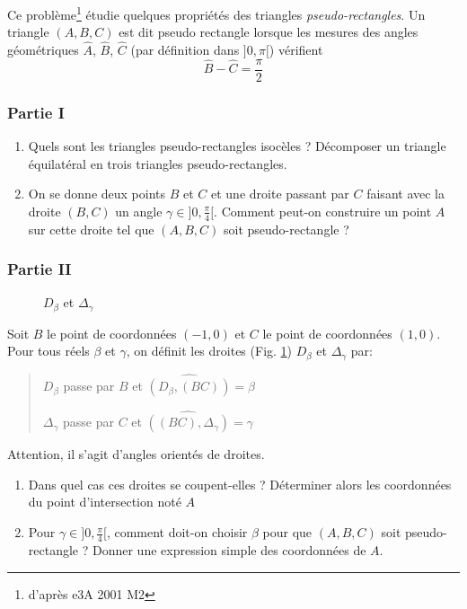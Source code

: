 Ce problème\footnote{d'après e3A 2001 M2} étudie quelques propriétés des triangles \emph{pseudo-rectangles}.\newline
Un triangle $(A,B,C)$ est dit pseudo rectangle lorsque les mesures  des angles géométriques $\widehat{A}$, $\widehat{B}$, $\widehat{C}$ (par définition dans $]0,\pi[$) vérifient
\[\widehat{B}-\widehat{C}=\frac{\pi}{2}\]
\subsubsection*{Partie I}
\begin{enumerate}
\item  Quels sont les triangles pseudo-rectangles isocèles ? Décomposer un triangle équilatéral en trois triangles pseudo-rectangles.
\item On se donne deux points $B$ et $C$ et une droite passant par $C$ faisant avec la droite $(B,C)$ un angle $\gamma\in ]0,\frac{\pi}{4}[$. Comment peut-on construire un point $A$ sur cette droite tel que $(A,B,C)$ soit pseudo-rectangle ?
\end{enumerate}
\subsubsection*{Partie II}
\begin{figure}
\centering

\caption{$D_\beta$ et $\Delta_\gamma$}
\label{fig:Epseudorec_1}
\end{figure} 
Soit $B$ le point de coordonnées $(-1,0)$ et $C$ le point de coordonnées $(1,0)$. Pour tous réels $\beta$ et $\gamma$, on définit les droites (Fig. \ref{fig:Epseudorec_1}) $D_\beta$ et $\Delta_\gamma$ par:
\begin{quotation}
$D_\beta$ passe par $B$ et $\widehat{(D_\beta , (BC))}=\beta$

$\Delta_\gamma$ passe par $C$ et $\widehat{((BC),\Delta_\gamma)}=\gamma$
\end{quotation}
Attention, il s'agit d'angles orientés de droites.
\begin{enumerate}
\item Dans quel cas ces droites se coupent-elles ? Déterminer alors les coordonnées du point d'intersection noté $A$
\item Pour $\gamma \in ]0,\frac{\pi}{4}[$, comment doit-on choisir $\beta$ pour que $(A,B,C)$ soit pseudo-rectangle ? Donner une expression simple des coordonnées de $A$.
\end{enumerate}

